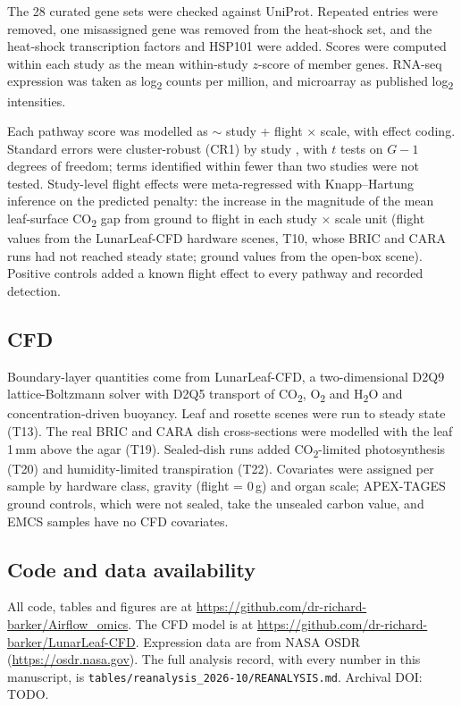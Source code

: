 \documentclass[11pt,a4paper]{article}
\begin{document}
The 28 curated gene sets were checked against UniProt. Repeated entries were removed, one misassigned gene was removed from the heat-shock set, and the heat-shock transcription factors and HSP101 were added. Scores were computed within each study as the mean within-study $z$-score of member genes. RNA-seq expression was taken as log\textsubscript{2} counts per million, and microarray as published log\textsubscript{2} intensities.

Each pathway score was modelled as $\sim$ study + flight $\times$ scale, with effect coding. Standard errors were cluster-robust (CR1) by study \citep{cameron2015}, with $t$ tests on $G - 1$ degrees of freedom; terms identified within fewer than two studies were not tested. Study-level flight effects were meta-regressed with Knapp--Hartung inference \citep{knapp2003} on the predicted penalty: the increase in the magnitude of the mean leaf-surface CO\textsubscript{2} gap from ground to flight in each study $\times$ scale unit (flight values from the LunarLeaf-CFD hardware scenes, T10, whose BRIC and CARA runs had not reached steady state; ground values from the open-box scene). Positive controls added a known flight effect to every pathway and recorded detection.

\subsection*{CFD}

Boundary-layer quantities come from LunarLeaf-CFD, a two-dimensional D2Q9 lattice-Boltzmann solver with D2Q5 transport of CO\textsubscript{2}, O\textsubscript{2} and H\textsubscript{2}O and concentration-driven buoyancy. Leaf and rosette scenes were run to steady state (T13). The real BRIC and CARA dish cross-sections were modelled with the leaf 1\,mm above the agar (T19). Sealed-dish runs added CO\textsubscript{2}-limited photosynthesis (T20) and humidity-limited transpiration (T22). Covariates were assigned per sample by hardware class, gravity (flight = 0\,g) and organ scale; APEX-TAGES ground controls, which were not sealed, take the unsealed carbon value, and EMCS samples have no CFD covariates.

\subsection*{Code and data availability}

All code, tables and figures are at \url{https://github.com/dr-richard-barker/Airflow_omics}. The CFD model is at \url{https://github.com/dr-richard-barker/LunarLeaf-CFD}. Expression data are from NASA OSDR (\url{https://osdr.nasa.gov}). The full analysis record, with every number in this manuscript, is \texttt{tables/reanalysis\_2026-10/REANALYSIS.md}. Archival DOI: TODO.
\end{document}

